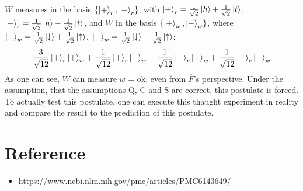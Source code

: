 \documentclass[a4paper]{article}
\begin{document}
$\overline{W}$ measures in the basis $\qty{\ket{+}_{r}, \ket{-}_{r}}$,
with $\ket{+}_{r} = \frac{1}{\sqrt{2}} \ket{h} + \frac{1}{\sqrt{2}} \ket{t}$, $\ket{-}_{r} = \frac{1}{\sqrt{2}} \ket{h} - \frac{1}{\sqrt{2}} \ket{t}$,
and $W$ in the basis $\qty{\ket{+}_{w}, \ket{-}_{w}}$,
where $\ket{+}_{w} = \frac{1}{\sqrt{2}} \ket{\downarrow} + \frac{1}{\sqrt{2}} \ket{\uparrow}$, $\ket{-}_{w} = \frac{1}{\sqrt{2}} \ket{\downarrow} - \frac{1}{\sqrt{2}} \ket{\uparrow}$:
\begin{align*}
\frac{3}{\sqrt{12}}\ket{+}_{r}\ket{+}_{w} + \frac{1}{\sqrt{12}}\ket{+}_{r}\ket{-}_{w} - \frac{1}{\sqrt{12}}\ket{-}_{r}\ket{+}_{w} + \frac{1}{\sqrt{12}}\ket{-}_{r}\ket{-}_{w}
\end{align*}
As one can see, $W$ can measure $w$ = ok, even from $\overline{F}$'s perspective.
Under the assumption, that the assumptions Q, C and S are correct, this postulate is forced.
To actually test this postulate, one can execute this thaught experiment in reality and compare the result to the prediction of this postulate.

\section*{Reference}
\begin{itemize}
	\item \url{https://www.ncbi.nlm.nih.gov/pmc/articles/PMC6143649/}
\end{itemize}
\end{document}
